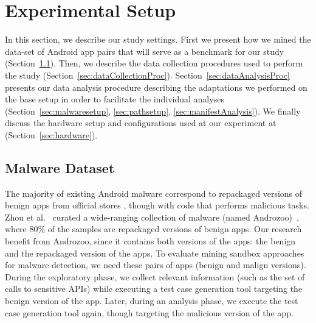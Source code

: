 \section{Experimental Setup}\label{sec:experimentalSetup}


In this section, we describe our study settings. First we present how we mined the data-set of Android app pairs that will serve as a benchmark for our study (Section~\ref{sec:dataset}).  Then, we describe the data collection procedures used to perform the study (Section~\ref{sec:dataCollectionProc}). Section~\ref{sec:dataAnalysisProc} presents our data analysis procedure describing the adaptations we performed on the base setup in order to facilitate the individual analyses (Section~\ref{sec:malwaresetup}, \ref{sec:pathsetup}, \ref{sec:manifestAnalysis}). We finally discuss the hardware setup and configurations used at our experiment at (Section~\ref{sec:hardware}).


\subsection{Malware Dataset}\label{sec:dataset}

The majority of existing Android malware correspond to repackaged versions of benign apps from official stores\cite{DBLP:conf/codaspy/ZhouZJN12} 
, though with code that performs malicious tasks. Zhou et al.~\cite{DBLP:conf/sp/ZhouJ12} curated a wide-ranging collection of malware (named Androzoo)~\cite{DBLP:conf/msr/AllixBKT16}, where 80\% of the samples are repackaged versions of benign apps. Our research benefit from Androzoo, since it contains both versions of the apps: the benign and the repackaged version of the apps. To evaluate mining sandbox approaches for malware detection, we need these pairs of apps (benign and malign versions). During the exploratory phase, we collect relevant information (such as the set of calls to sensitive APIs) while executing a test case generation tool targeting the benign version of the app. Later, during an analysis phase, we execute the test case generation tool again, though targeting the malicious version of the app.


